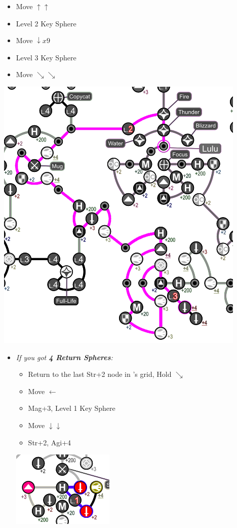 \begin{spheregrid}
	\begin{multicols}{2}
		\begin{itemize}
			\luluf
			\begin{itemize}
				\item Move $\uparrow\uparrow$
				\item Level 2 Key Sphere
				\item Move $\downarrow x9$
				\item Level 3 Key Sphere
				\item Move $\searrow\searrow$
			\end{itemize}
			\includegraphics[width=.75\columnwidth]{graphics/lulu_grid}
			\yunaf
			\begin{itemize}
				\item \textit{If you got \textbf{4 Return Spheres}:}
				      \begin{itemize}
					      \item Return to the last Str+2 node in \wakka's grid, Hold $\searrow$
					      \item Move $\leftarrow$
					      \item Mag+3, Level 1 Key Sphere
					      \item Move $\downarrow\downarrow$
					      \item Str+2, Agi+4
				      \end{itemize}
				      \includegraphics[width=.5\columnwidth]{graphics/4_returns_1}

\end{itemize}
\end{itemize}
\end{multicols}
\end{spheregrid}

